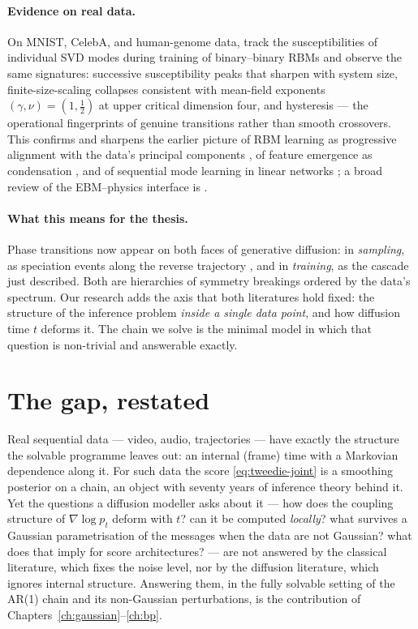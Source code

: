 \paragraph{Evidence on real data.} On MNIST, CelebA, and human-genome
data, \citet{bachtis2024cascade} track the susceptibilities of individual
SVD modes during training of binary--binary RBMs and observe the same
signatures: successive susceptibility peaks that sharpen with system size,
finite-size-scaling collapses consistent with mean-field exponents
$(\gamma, \nu) = (1, \tfrac12)$ at upper critical dimension four, and
hysteresis --- the operational fingerprints of genuine transitions rather
than smooth crossovers. This confirms and sharpens the earlier picture of
RBM learning as progressive alignment with the data's principal components
\citep{decelle2017spectral}, of feature emergence as condensation
\citep{tubiana2017emergence}, and of sequential mode learning in linear
networks \citep{saxe2014exact}; a broad review of the EBM--physics
interface is \citet{carbone2025hitchhiker}.

\paragraph{What this means for the thesis.} Phase transitions now appear on
both faces of generative diffusion: in \emph{sampling}, as speciation
events along the reverse trajectory \citep{biroli2024dynamical}, and in
\emph{training}, as the cascade just described. Both are hierarchies of
symmetry breakings ordered by the data's spectrum. Our research adds the
axis that both literatures hold fixed: the structure of the inference
problem \emph{inside a single data point}, and how diffusion time $t$
deforms it. The chain we solve is the minimal model in which that question
is non-trivial and answerable exactly.

\section{The gap, restated}\label{sec:gap}

Real sequential data --- video, audio, trajectories --- have exactly the
structure the solvable programme leaves out: an internal (frame) time with
a Markovian dependence along it. For such data the score
\eqref{eq:tweedie-joint} is a smoothing posterior on a chain, an object
with seventy years of inference theory behind it. Yet the questions a
diffusion modeller asks about it --- how does the coupling structure of
$\nabla \log p_t$ deform with $t$? can it be computed \emph{locally}? what
survives a Gaussian parametrisation of the messages when the data are not
Gaussian? what does that imply for score architectures? --- are not
answered by the classical literature, which fixes the noise level, nor by
the diffusion literature, which ignores internal structure. Answering
them, in the fully solvable setting of the AR(1) chain and its
non-Gaussian perturbations, is the contribution of
Chapters~\ref{ch:gaussian}--\ref{ch:bp}.
